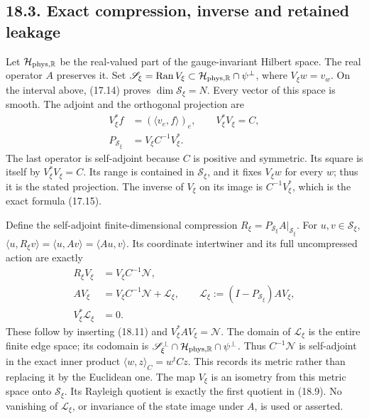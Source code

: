 \documentclass[
]{article}
\begin{document}
\subsection{18.3. Exact compression, inverse and retained
leakage}\label{exact-compression-inverse-and-retained-leakage}

Let \(\mathcal H_{\rm phys,\mathbb R}\) be the real-valued part of the
gauge-invariant Hilbert space. The real operator \(A\) preserves it. Set
\(\mathscr S_\xi=\operatorname{Ran}V_\xi\subset
 \mathcal H_{\rm phys,\mathbb R}\cap\psi^\perp\), where \(V_\xi w=v_w\).
On the interval above, (17.14) proves \(\dim\mathscr S_\xi=N\). Every
vector of this space is smooth. The adjoint and the orthogonal
projection are \[
\begin{split}
V_\xi^*f&=(\langle v_e,f\rangle)_e,\qquad V_\xi^*V_\xi=C,\\
P_{\mathscr S_\xi}&=V_\xi C^{-1}V_\xi^*.
\end{split}                                                   \tag{18.11}
\] The last operator is self-adjoint because \(C\) is positive and
symmetric. Its square is itself by \(V_\xi^*V_\xi=C\). Its range is
contained in \(\mathscr S_\xi\), and it fixes \(V_\xi w\) for every
\(w\); thus it is the stated projection. The inverse of \(V_\xi\) on its
image is \(C^{-1}V_\xi^*\), which is the exact formula (17.15).

Define the self-adjoint finite-dimensional compression
\(R_\xi=P_{\mathscr S_\xi}A|_{\mathscr S_\xi}\). For
\(u,v\in\mathscr S_\xi\), \(\langle u,R_\xi v\rangle=\langle u,Av\rangle
=\langle Au,v\rangle\). Its coordinate intertwiner and its full
uncompressed action are exactly \[
\begin{split}
R_\xi V_\xi&=V_\xi C^{-1}\mathcal N,\\
AV_\xi&=V_\xi C^{-1}\mathcal N+\mathcal L_\xi,\qquad
\mathcal L_\xi:=(I-P_{\mathscr S_\xi})AV_\xi,\\
V_\xi^*\mathcal L_\xi&=0.
\end{split}                                                   \tag{18.12}
\] These follow by inserting (18.11) and \(V_\xi^*AV_\xi=\mathcal N\).
The domain of \(\mathcal L_\xi\) is the entire finite edge space; its
codomain is \(\mathscr S_\xi^\perp\cap
\mathcal H_{\rm phys,\mathbb R}\cap\psi^\perp\). Thus
\(C^{-1}\mathcal N\) is self-adjoint in the exact inner product
\(\langle w,z\rangle_C=w^tCz\). This records its metric rather than
replacing it by the Euclidean one. The map \(V_\xi\) is an isometry from
this metric space onto \(\mathscr S_\xi\). Its Rayleigh quotient is
exactly the first quotient in (18.9). No vanishing of
\(\mathcal L_\xi\), or invariance of the state image under \(A\), is
used or asserted.
\end{document}
